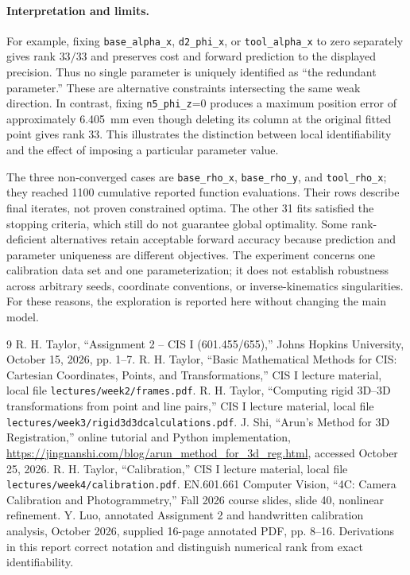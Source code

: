 \documentclass[11pt]{article}
\begin{document}
\paragraph{Interpretation and limits.}
For example, fixing \texttt{base\_alpha\_x}, \texttt{d2\_phi\_x}, or \texttt{tool\_alpha\_x} to zero separately gives rank $33/33$ and preserves cost and forward prediction to the displayed precision. Thus no single parameter is uniquely identified as ``the redundant parameter.'' These are alternative constraints intersecting the same weak direction. In contrast, fixing \texttt{n5\_phi\_z}=0 produces a maximum position error of approximately 6.405~mm even though deleting its column at the original fitted point gives rank 33. This illustrates the distinction between local identifiability and the effect of imposing a particular parameter value.

The three non-converged cases are \texttt{base\_rho\_x}, \texttt{base\_rho\_y}, and \texttt{tool\_rho\_x}; they reached 1100 cumulative reported function evaluations. Their rows describe final iterates, not proven constrained optima. The other 31 fits satisfied the stopping criteria, which still do not guarantee global optimality. Some rank-deficient alternatives retain acceptable forward accuracy because prediction and parameter uniqueness are different objectives. The experiment concerns one calibration data set and one parameterization; it does not establish robustness across arbitrary seeds, coordinate conventions, or inverse-kinematics singularities. For these reasons, the exploration is reported here without changing the main model.

\clearpage
\begin{thebibliography}{9}
 R. H. Taylor, ``Assignment 2 -- CIS I (601.455/655),'' Johns Hopkins University, October 15, 2026, pp. 1--7.
 R. H. Taylor, ``Basic Mathematical Methods for CIS: Cartesian Coordinates, Points, and Transformations,'' CIS I lecture material, local file \texttt{lectures/week2/frames.pdf}.
 R. H. Taylor, ``Computing rigid 3D--3D transformations from point and line pairs,'' CIS I lecture material, local file \texttt{lectures/week3/rigid3d3dcalculations.pdf}.
 J. Shi, ``Arun's Method for 3D Registration,'' online tutorial and Python implementation, \url{https://jingnanshi.com/blog/arun_method_for_3d_reg.html}, accessed October 25, 2026.
 R. H. Taylor, ``Calibration,'' CIS I lecture material, local file \texttt{lectures/week4/calibration.pdf}.
 EN.601.661 Computer Vision, ``4C: Camera Calibration and Photogrammetry,'' Fall 2026 course slides, slide 40, nonlinear refinement.
 Y. Luo, annotated Assignment 2 and handwritten calibration analysis, October 2026, supplied 16-page annotated PDF, pp. 8--16. Derivations in this report correct notation and distinguish numerical rank from exact identifiability.
\end{thebibliography}
\end{document}

